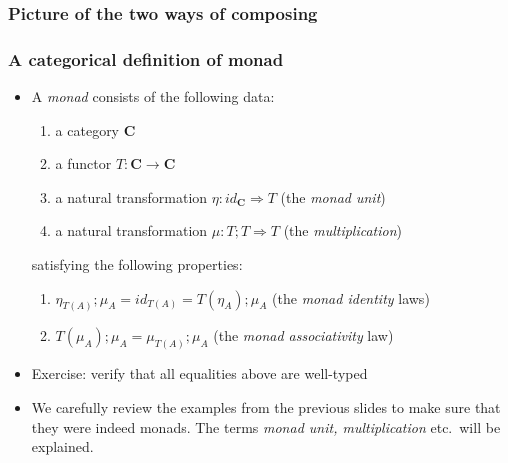 \documentclass[handout]{beamer}
\newcommand{\To}{\Rightarrow}
\newcommand{\bfsf}[1]{{\boldsymbol{#1}}}
\newcommand{\CC}{\bfsf{C}}
\begin{document}
\frame
  {   
    \frametitle{Picture of the two ways of composing}\label{Mon5:PicTwoMonad}





 }


\frame
  {   
    \frametitle{A categorical definition of monad}\label{Mon5:CatDefMonad}

 \begin{itemize}[<+->]
\item A \emph{monad} consists of the following data:
 \begin{enumerate}
    \item a category $\CC$
    \item a functor $T:\CC\to\CC$
    \item a natural transformation $\eta: id_\CC \To T$ (the \emph{monad unit})
    \item a natural transformation $\mu: T;T \To T$ (the \emph{multiplication})
 \end{enumerate}
satisfying the following properties:
 \begin{enumerate}
    \item $\eta_{T(A)};\mu_A = id_{T(A)} = T(\eta_A);\mu_A$ (the \emph{monad identity} laws)
    \item $T(\mu_A);\mu_A = \mu_{T(A)};\mu_A$ (the \emph{monad associativity} law)
 \end{enumerate}
\item Exercise: verify that all equalities above are well-typed
\item We carefully review the examples from the previous slides to 
make sure that they were indeed monads. 
The terms \emph{monad unit, multiplication} etc.\ will be explained.
 \end{itemize}

 }
\end{document}
